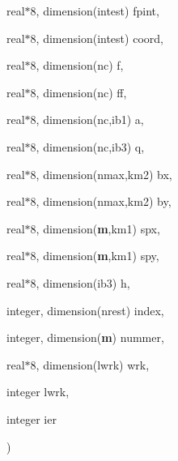 {\begin{DoxyParamCaption}
\item[{real$\ast$8, dimension(intest)}]{fpint, }
\item[{real$\ast$8, dimension(intest)}]{coord, }
\item[{real$\ast$8, dimension(nc)}]{f, }
\item[{real$\ast$8, dimension(nc)}]{ff, }
\item[{real$\ast$8, dimension(nc,ib1)}]{a, }
\item[{real$\ast$8, dimension(nc,ib3)}]{q, }
\item[{real$\ast$8, dimension(nmax,km2)}]{bx, }
\item[{real$\ast$8, dimension(nmax,km2)}]{by, }
\item[{real$\ast$8, dimension({\bf m},km1)}]{spx, }
\item[{real$\ast$8, dimension({\bf m},km1)}]{spy, }
\item[{real$\ast$8, dimension(ib3)}]{h, }
\item[{integer, dimension(nrest)}]{index, }
\item[{integer, dimension({\bf m})}]{nummer, }
\item[{real$\ast$8, dimension(lwrk)}]{wrk, }
\item[{integer}]{lwrk, }
\item[{integer}]{ier}
\end{DoxyParamCaption}
)}\label{fpsurf_8f_a92bf415936a58406bd840c2fae1553b2}
